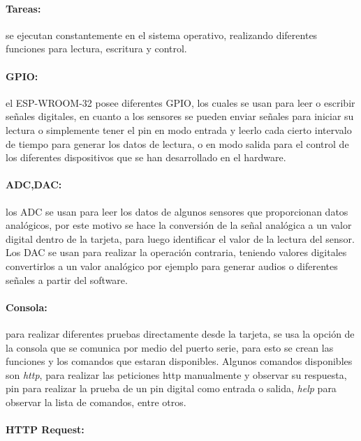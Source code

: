 \paragraph{Tareas:}

se ejecutan constantemente en el sistema operativo, realizando diferentes funciones para lectura, escritura y control.

\paragraph{GPIO:}

el ESP-WROOM-32 posee diferentes GPIO, los cuales se usan para leer o escribir señales digitales, en cuanto a los sensores se pueden enviar señales para iniciar su lectura o simplemente tener el pin en modo entrada y leerlo cada cierto intervalo de tiempo para generar los datos de lectura, o en modo salida para el control de los diferentes dispositivos que se han desarrollado en el hardware.

\paragraph{ADC,DAC:}

los ADC se usan para leer los datos de algunos sensores que proporcionan datos analógicos, por este motivo se hace la conversión de la señal analógica a un valor digital dentro de la tarjeta, para luego identificar el valor de la lectura del sensor. Los DAC se usan para realizar la operación contraria, teniendo valores digitales convertirlos a un valor analógico por ejemplo para generar audios o diferentes señales a partir del software.

\paragraph{Consola:}

para realizar diferentes pruebas directamente desde la tarjeta, se usa la opción de la consola que se comunica por medio del puerto serie, para esto se crean las funciones y los comandos que estaran disponibles. Algunos comandos disponibles son \textit{http}, para realizar las peticiones http manualmente y observar su respuesta, pin para realizar la prueba de un pin digital como entrada o salida, \textit{help} para observar la lista de comandos, entre otros.

\paragraph{HTTP Request:}

